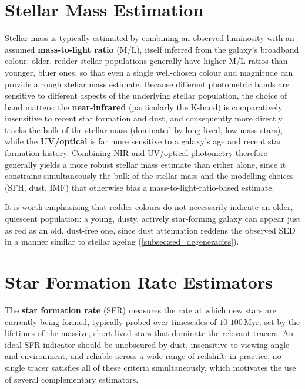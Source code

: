\section{Stellar Mass Estimation} \label{sec:stellar_mass}

Stellar mass is typically estimated by combining an observed luminosity with an assumed \textbf{mass-to-light ratio} (M/L), itself inferred from the galaxy's broadband colour: older, redder stellar populations generally have higher M/L ratios than younger, bluer ones, so that even a single well-chosen colour and magnitude can provide a rough stellar mass estimate. Because different photometric bands are sensitive to different aspects of the underlying stellar population, the choice of band matters: the \textbf{near-infrared} (particularly the K-band) is comparatively insensitive to recent star formation and dust, and consequently more directly tracks the bulk of the stellar mass (dominated by long-lived, low-mass stars), while the \textbf{UV/optical} is far more sensitive to a galaxy's age and recent star formation history. Combining NIR and UV/optical photometry therefore generally yields a more robust stellar mass estimate than either alone, since it constrains simultaneously the bulk of the stellar mass and the modelling choices (SFH, dust, IMF) that otherwise bias a mass-to-light-ratio-based estimate.

\medskip

It is worth emphasising that redder colours do not necessarily indicate an older, quiescent population: a young, dusty, actively star-forming galaxy can appear just as red as an old, dust-free one, since dust attenuation reddens the observed SED in a manner similar to stellar ageing (\cref{subsec:sed_degeneracies}).

\section{Star Formation Rate Estimators} \label{sec:sfr_estimators}

The \textbf{star formation rate} (SFR) measures the rate at which new stars are currently being formed, typically probed over timescales of $10$-$100\,\text{Myr}$, set by the lifetimes of the massive, short-lived stars that dominate the relevant tracers. An ideal SFR indicator should be unobscured by dust, insensitive to viewing angle and environment, and reliable across a wide range of redshift; in practice, no single tracer satisfies all of these criteria simultaneously, which motivates the use of several complementary estimators.

